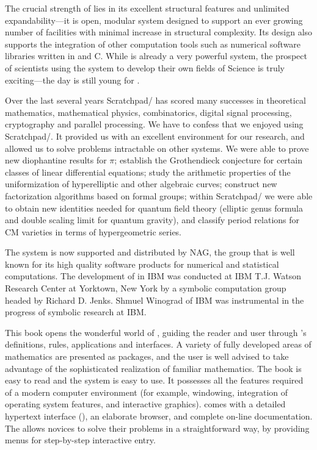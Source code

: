 The crucial strength of \Language{} lies in its excellent
structural features and unlimited expandability---it is open,
modular system designed to support an ever growing number of
facilities with minimal increase in structural complexity.
Its design also supports the integration of other computation
tools such as numerical software libraries written in \Fortran{} and
C.
While \Language{} is already a very powerful system, the prospect
of scientists using the system to develop their own fields of
Science is truly exciting---the day is still young for
\Language{}.

Over the last several years Scratchpad/\Language{} has scored many
successes in theoretical mathematics, mathematical physics,
combinatorics, digital signal processing, cryptography and
parallel processing.
We have to confess that we enjoyed using Scratchpad/\Language{}.
It provided us with an excellent environment for our research, and
allowed us to solve problems intractable on other systems.
We were able to prove new diophantine results for $\pi$; establish
the Grothendieck conjecture for certain classes of linear
differential equations; study the arithmetic properties of the
uniformization of hyperelliptic and other algebraic curves;
construct new factorization algorithms based on formal groups;
within Scratchpad/\Language{} we were able to obtain new
identities needed for quantum field theory (elliptic genus formula
and double scaling limit for quantum gravity), and classify period
relations for CM varieties in terms of hypergeometric series.

The \Language{} system is now supported and distributed by NAG, the group
that is well known for its high quality software products for numerical
and statistical computations.
The development of \Language{} in IBM was
conducted at IBM T.J. Watson Research Center at Yorktown, New York
by a symbolic computation group headed by Richard D. Jenks.  Shmuel
Winograd of IBM was instrumental in the progress of symbolic research
at IBM.

This book opens the wonderful world of \Language{}, guiding the
reader and user through \Language{}'s definitions, rules,
applications and interfaces.
A variety of fully developed areas of mathematics are presented as
packages, and the user is well advised to take advantage of the
sophisticated realization of familiar mathematics.
The \Language{} book is easy to read and the \Language{} system is
easy to use.
It possesses all the features required of a modern computer
environment (for example, windowing, integration of operating system
features, and interactive graphics).
\Language{} comes with a detailed hypertext interface (\HyperName{}),
an elaborate browser, and complete on-line documentation.
The \HyperName{} allows novices to solve their problems in a
straightforward way, by providing menus for step-by-step
interactive entry.

